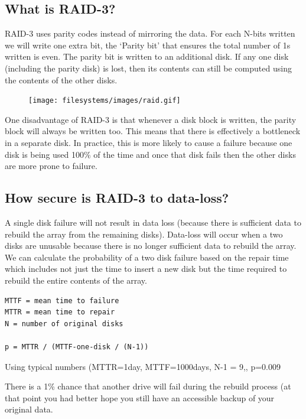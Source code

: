 \subsection{What is RAID-3?}\label{what-is-raid-3}

RAID-3 uses parity codes instead of mirroring the data. For each N-bits written we will write one extra bit, the `Parity bit' that ensures the total number of 1s written is even. The parity bit is written to an additional disk. If any one disk (including the parity disk) is lost, then its contents can still be computed using the contents of the other disks.

\begin{figure}[htbp]
\centering
\texttt{[image: filesystems/images/raid.gif]}
\caption{}
\end{figure}

One disadvantage of RAID-3 is that whenever a disk block is written, the parity block will always be written too. This means that there is effectively a bottleneck in a separate disk. In practice, this is more likely to cause a failure because one disk is being used 100\% of the time and once that disk fails then the other disks are more prone to failure.

\subsection{How secure is RAID-3 to data-loss?}\label{how-secure-is-raid-3-to-data-loss}

A single disk failure will not result in data loss (because there is sufficient data to rebuild the array from the remaining disks). Data-loss will occur when a two disks are unusable because there is no longer sufficient data to rebuild the array. We can calculate the probability of a two disk failure based on the repair time which includes not just the time to insert a new disk but the time required to rebuild the entire contents of the array.

\begin{lstlisting}
MTTF = mean time to failure
MTTR = mean time to repair
N = number of original disks

p = MTTR / (MTTF-one-disk / (N-1))
\end{lstlisting}

Using typical numbers (MTTR=1day, MTTF=1000days, N-1 = 9,, p=0.009

There is a 1\% chance that another drive will fail during the rebuild process (at that point you had better hope you still have an accessible backup of your original data.


